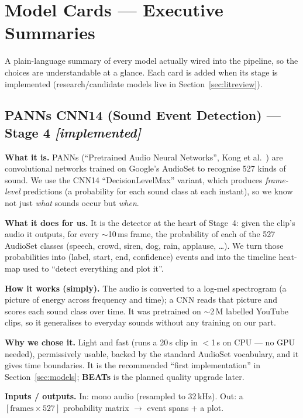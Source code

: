 \documentclass[11pt,a4paper]{article}
\begin{document}
\section{Model Cards --- Executive Summaries}\label{sec:modelcards}
A plain-language summary of every model actually wired into the pipeline, so the
choices are understandable at a glance. Each card is added when its stage is
implemented (research/candidate models live in Section~\ref{sec:litreview}).

\subsection{PANNs CNN14 (Sound Event Detection) --- Stage 4 \emph{[implemented]}}
\textbf{What it is.} PANNs (``Pretrained Audio Neural Networks'', Kong et
al.~\cite{panns}) are convolutional networks trained on Google's AudioSet to
recognise 527 kinds of sound. We use the CNN14 ``DecisionLevelMax'' variant,
which produces \emph{frame-level} predictions (a probability for each sound class
at each instant), so we know not just \emph{what} sounds occur but \emph{when}.

\textbf{What it does for us.} It is the detector at the heart of Stage~4: given
the clip's audio it outputs, for every $\sim$10\,ms frame, the probability of each
of the 527 AudioSet classes (speech, crowd, siren, dog, rain, applause, \dots).
We turn those probabilities into (label, start, end, confidence) events and into
the timeline heat-map used to ``detect everything and plot it''.

\textbf{How it works (simply).} The audio is converted to a log-mel spectrogram (a
picture of energy across frequency and time); a CNN reads that picture and scores
each sound class over time. It was pretrained on $\sim$2\,M labelled YouTube clips,
so it generalises to everyday sounds without any training on our part.

\textbf{Why we chose it.} Light and fast (runs a 20\,s clip in $<$1\,s on CPU ---
no GPU needed), permissively usable, backed by the standard AudioSet vocabulary,
and it gives time boundaries. It is the recommended ``first implementation'' in
Section~\ref{sec:models}; \textbf{BEATs} is the planned quality upgrade later.

\textbf{Inputs / outputs.} In: mono audio (resampled to 32\,kHz). Out: a
$[\text{frames}\times 527]$ probability matrix $\rightarrow$ event spans + a plot.
\end{document}
